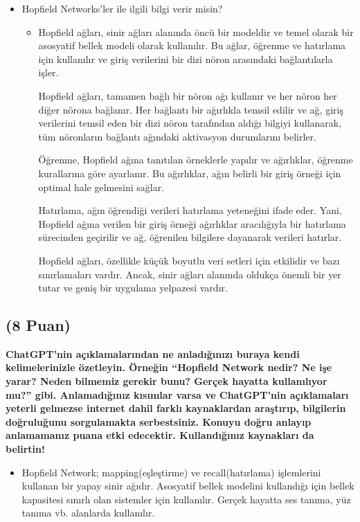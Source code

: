 \documentclass[11pt]{article}
\begin{document}
\begin{itemize}
        \item{Hopfield Networks'ler ile ilgili bilgi verir misin?}
        \begin{itemize}
            \item {Hopfield ağları, sinir ağları alanında öncü bir modeldir ve temel olarak bir asosyatif bellek modeli olarak kullanılır. Bu ağlar, öğrenme ve hatırlama için kullanılır ve giriş verilerini bir dizi nöron arasındaki bağlantılarla işler.

Hopfield ağları, tamamen bağlı bir nöron ağı kullanır ve her nöron her diğer nörona bağlanır. Her bağlantı bir ağırlıkla temsil edilir ve ağ, giriş verilerini temsil eden bir dizi nöron tarafından aldığı bilgiyi kullanarak, tüm nöronların bağlantı ağındaki aktivasyon durumlarını belirler.

Öğrenme, Hopfield ağına tanıtılan örneklerle yapılır ve ağırlıklar, öğrenme kurallarına göre ayarlanır. Bu ağırlıklar, ağın belirli bir giriş örneği için optimal hale gelmesini sağlar.

Hatırlama, ağın öğrendiği verileri hatırlama yeteneğini ifade eder. Yani, Hopfield ağına verilen bir giriş örneği ağırlıklar aracılığıyla bir hatırlama sürecinden geçirilir ve ağ, öğrenilen bilgilere dayanarak verileri hatırlar.

Hopfield ağları, özellikle küçük boyutlu veri setleri için etkilidir ve bazı sınırlamaları vardır. Ancak, sinir ağları alanında oldukça önemli bir yer tutar ve geniş bir uygulama yelpazesi vardır.}
        \end{itemize}
    \end{itemize}

\subsection{(8 Puan)} \textbf{ChatGPT’nin açıklamalarından ne anladığınızı buraya kendi kelimelerinizle özetleyin. Örneğin ``Hopfield Network nedir? Ne işe yarar? Neden bilmemiz gerekir bunu? Gerçek hayatta kullanılıyor mu?'' gibi. Anlamadığınız kısımlar varsa ve ChatGPT’nin açıklamaları yeterli gelmezse internet dahil farklı kaynaklardan araştırıp, bilgilerin doğruluğunu sorgulamakta serbestsiniz. Konuyu doğru anlayıp anlamamanız puana etki edecektir. Kullandığınız kaynakları da belirtin!}
\begin{itemize}
    \item{Hopfield Network; mapping(eşleştirme) ve recall(hatırlama) işlemlerini kullanan bir yapay sinir ağıdır. Asosyatif bellek modelini kullandığı için bellek kapasitesi sınırlı olan sistemler için kullanılır. Gerçek hayatta ses tanıma, yüz tanıma vb. alanlarda kullanılır.}  
\end{itemize}
\end{document}
